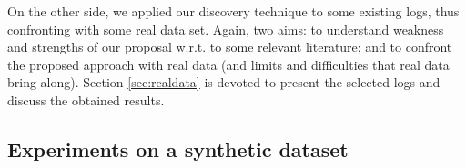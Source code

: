 On the other side, we applied our discovery technique to some existing logs, thus confronting with some real data set. Again, two aims: to understand weakness and strengths of our proposal w.r.t. to some relevant literature; and to confront the proposed approach with real data (and limits and difficulties that real data bring along). Section \ref{sec:realdata} is devoted to present the selected logs and discuss the obtained results.




\subsection{Experiments on a synthetic dataset}
\label{sec:syntheticlog}

%


